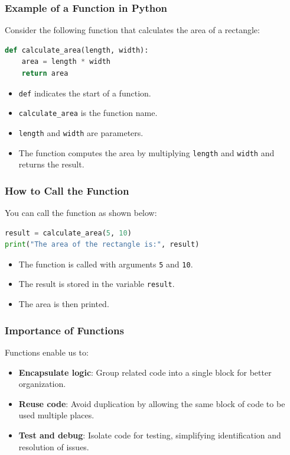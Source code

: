 \documentclass{beamer}
\begin{document}
\begin{frame}[fragile]
    \frametitle{Example of a Function in Python}
    Consider the following function that calculates the area of a rectangle:
    
    \begin{lstlisting}[language=Python]
def calculate_area(length, width):
    area = length * width
    return area
    \end{lstlisting}
    
    \begin{itemize}
        \item \texttt{def} indicates the start of a function.
        \item \texttt{calculate\_area} is the function name.
        \item \texttt{length} and \texttt{width} are parameters.
        \item The function computes the area by multiplying \texttt{length} and \texttt{width} and returns the result.
    \end{itemize}
\end{frame}

\begin{frame}[fragile]
    \frametitle{How to Call the Function}
    You can call the function as shown below:

    \begin{lstlisting}[language=Python]
result = calculate_area(5, 10)
print("The area of the rectangle is:", result)
    \end{lstlisting}

    \begin{itemize}
        \item The function is called with arguments \texttt{5} and \texttt{10}.
        \item The result is stored in the variable \texttt{result}.
        \item The area is then printed.
    \end{itemize}
\end{frame}

\begin{frame}[fragile]
    \frametitle{Importance of Functions}
    Functions enable us to:
    \begin{itemize}
        \item \textbf{Encapsulate logic}: Group related code into a single block for better organization.
        \item \textbf{Reuse code}: Avoid duplication by allowing the same block of code to be used multiple places.
        \item \textbf{Test and debug}: Isolate code for testing, simplifying identification and resolution of issues.
    \end{itemize}
\end{frame}
\end{document}
